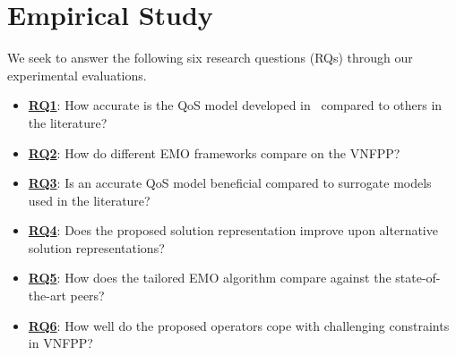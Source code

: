 
\section{Empirical Study}
\label{sec:experiments}
We seek to answer the following six research questions (RQs) through our experimental evaluations.
\begin{itemize}
    \item\underline{\textbf{RQ1}}: How accurate is the QoS model developed in~ compared to others in the literature?
    \item\underline{\textbf{RQ2}}: How do different EMO frameworks compare on the VNFPP?
    \item\underline{\textbf{RQ3}}: Is an accurate QoS model beneficial compared to surrogate models used in the literature?
    \item\underline{\textbf{RQ4}}: Does the proposed solution representation improve upon alternative solution representations?
    \item\underline{\textbf{RQ5}}: How does the tailored EMO algorithm compare against the state-of-the-art peers?
    \item\underline{\textbf{RQ6}}: How well do the proposed operators cope with challenging constraints in VNFPP?
\end{itemize}


